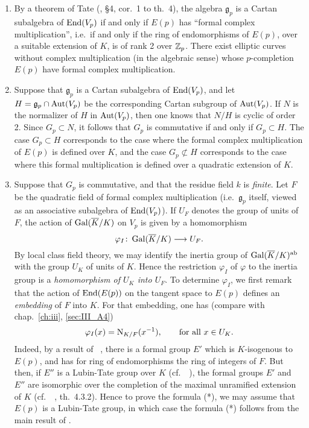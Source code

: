 \begin{subappendices}
\begin{obs}
\begin{enumerate}
	\item By a theorem of Tate (\cite{39}, \S4, cor.~1 to th.~4), the
		algebra $\mathfrak{g}_p$ is a Cartan subalgebra of $\operatorname{End}(V_p)$
		if and only if $E(p)$ has ``formal complex multiplication'',
		i.e.\ if and only if the ring of endomorphisms of $E(p)$, over
		a suitable extension of $K$, is of rank 2 over $\mathbb{Z}_p$. There
		exist elliptic curves without complex multiplication (in the
		algebraic sense) whose $p$-completion $E(p)$ have formal
		complex multiplication.
	\item Suppose that $\mathfrak{g}_p$ is a Cartan subalgebra of
		$\operatorname{End}(V_p)$, and let $H = \mathfrak{g}_p \cap \operatorname{Aut}(V_p)$ be the
		corresponding Cartan subgroup of $\operatorname{Aut}(V_p)$. If $N$ is the
		normalizer of $H$ in $\operatorname{Aut}(V_p)$, then one knows that $N/H$ is
		cyclic of order 2. Since $G_p \subset N$, it follows that $G_p$
		is commutative if and only if $G_p \subset H$. The case $G_p
		\subset H$ corresponds to the case where the formal complex
		multiplication of $E(p)$ is
		\dpage
		defined over $K$, and the case $G_p \not\subset H$ corresponds to
		the case where this formal multiplication is defined over a
		quadratic extension of $K$.
	\item Suppose that $G_p$ is commutative, and that the residue field $k$
		is \emph{finite}. Let $F$ be the quadratic field of formal
		complex multiplication (i.e.\ $\mathfrak{g}_p$ itself, viewed
		as an associative subalgebra of $\operatorname{End}(V_p)$). If $U_F$ denotes
		the group of units of $F$, the action of $\operatorname{Gal}(\overline{K}/K)$ on
		$V_p$ is given by a homomorphism
		\[
			\varphi_I \colon \operatorname{Gal}(\overline{K}/K) \longrightarrow U_F.
		\]
		By local class field theory, we may identify the inertia group
		of $\operatorname{Gal}(\overline{K}/K)^{\mathrm{ab}}$ with the group $U_K$ of units of
		$K$. Hence the restriction $\varphi_I$ of $\varphi$ to the
		inertia group is a \emph{homomorphism of $U_K$ into $U_F$}.  To
		determine $\varphi_I$, we first remark that the action of
		$\operatorname{End}(E(p))$ on the tangent space to $E(p)$ defines an
		\emph{embedding} of $F$ into $K$. For that embedding, one has
		(compare with chap.~\ref{ch:iii}, \ref{sec:III_A4})
		\[
			\varphi_I(x) = \operatorname{N}_{K/F}(x^{-1}), \qquad \text{for
				all } x\in U_K.
		\]
		Indeed, by a result of \citeauthor{lubin:lie}~\cite{lubin:lie},
		there is a formal group $E'$ which is $K$-isogenous to $E(p)$,
		and has for ring of endomorphisms the ring of integers of $F$.
		But then, if $E''$ is a Lubin-Tate group over $K$ (cf.\
		\citeauthor{17}~\cite{17}), the formal groups $E'$ and $E''$
		are isomorphic over the completion of the maximal unramified
		extension of $K$ (cf.\ \citeauthor{16}~\cite{16}, th.~4.3.2).
		Hence to prove the formula (*),
		we may assume that $E(p)$ is a
		Lubin-Tate group, in which case the formula (*) follows from
		the main result of \cite{17}.
\end{enumerate}
\end{obs}


\end{subappendices}
